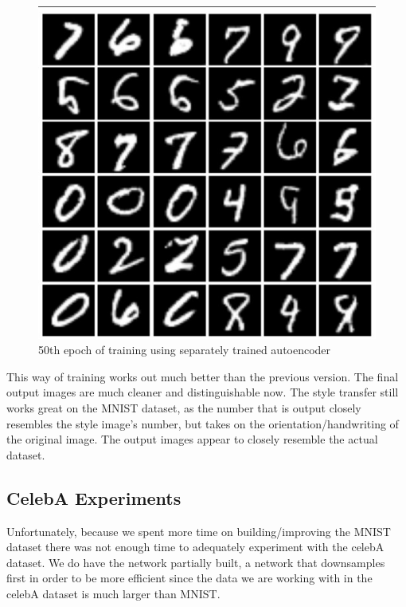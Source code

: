 \documentclass{article}
\begin{document}
\begin{figure}[hbt]
    \centering
    \includegraphics[scale=0.5]{images/EXP8_49.jpg}
    \caption{50th epoch of training using separately trained autoencoder}
    \label{fig:fig3}

\end{figure}

This way of training works out much better than the previous version. The final output images are much cleaner and 
distinguishable now. The style transfer still works great on the MNIST dataset, as the number that is output closely
resembles the style image's number, but takes on the orientation/handwriting of the original image. The output images appear
to closely resemble the actual dataset.

\subsection{CelebA Experiments}

Unfortunately, because we spent more time on building/improving the MNIST dataset there was not enough time to adequately experiment with
the celebA dataset. We do have the network partially built, a network that downsamples first in order to be more efficient since the data
we are working with in the celebA dataset is much larger than MNIST. 
\end{document}
